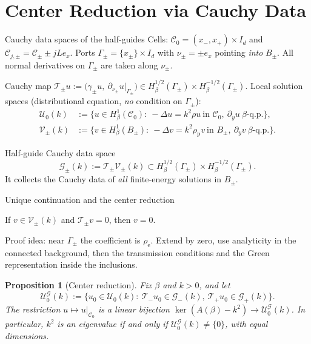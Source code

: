 \documentclass[aspectratio=169]{beamer}
\newtheorem{proposition}[theorem]{Proposition}
\begin{document}
\section{Center Reduction via Cauchy Data}

\begin{frame}{Cauchy data spaces of the half-guides}
  \small
  Cells: $\mathcal C_0=(x_-,x_+)\times I_d$ and $\mathcal C_{j,\pm}=\mathcal C_\pm\pm jLe_x$.
  Ports $\Gamma_\pm=\{x_\pm\}\times I_d$ with $\nu_\pm=\pm e_x$ pointing \emph{into}
  $B_\pm$. All normal derivatives on $\Gamma_\pm$ are taken along $\nu_\pm$.

  \medskip
  Cauchy map
  $\mathscr T_\pm u:=\bigl(\gamma_\pm u,\ \partial_{\nu_\pm}u|_{\Gamma_\pm}\bigr)\in
  H^{1/2}_\beta(\Gamma_\pm)\times H^{-1/2}_\beta(\Gamma_\pm)$. Local solution spaces
  (distributional equation, \emph{no} condition on $\Gamma_\pm$):
  \begin{align*}
    \mathcal U_0(k)&:=\{u\in H^1_\beta(\mathcal C_0):\ -\Delta u=k^2\rho u\ \text{in }\mathcal C_0,\
      \partial_yu\ \beta\text{-q.p.}\},\\
    \mathcal V_\pm(k)&:=\{v\in H^1_\beta(B_\pm):\ -\Delta v=k^2\rho_{\mathrm p}v\ \text{in }B_\pm,\
      \partial_yv\ \beta\text{-q.p.}\}.
  \end{align*}

  \begin{block}{Half-guide Cauchy data space}
    \[
      \mathcal G_\pm(k):=\mathscr T_\pm\mathcal V_\pm(k)
      \subset H^{1/2}_\beta(\Gamma_\pm)\times H^{-1/2}_\beta(\Gamma_\pm).
    \]
    It collects the Cauchy data of \emph{all} finite-energy solutions in $B_\pm$.
  \end{block}
\end{frame}

\begin{frame}{Unique continuation and the center reduction}
  \small
  \begin{lemma}
    If $v\in\mathcal V_\pm(k)$ and $\mathscr T_\pm v=0$, then $v=0$.
  \end{lemma}
  {\footnotesize Proof idea: near $\Gamma_\pm$ the coefficient is $\rho_{\mathrm e}$.
  Extend by zero, use analyticity in the connected background, then the transmission
  conditions and the Green representation inside the inclusions.}

  \begin{proposition}[Center reduction]
    Fix $\beta$ and $k>0$, and let
    \[
      \mathcal U_0^{\mathcal G}(k):=\bigl\{u_0\in\mathcal U_0(k):\
        \mathscr T_-u_0\in\mathcal G_-(k),\ \mathscr T_+u_0\in\mathcal G_+(k)\bigr\}.
    \]
    The restriction $u\mapsto u|_{\mathcal C_0}$ is a linear bijection
    $\ker(A(\beta)-k^2)\to\mathcal U_0^{\mathcal G}(k)$. In particular, $k^2$ is an
    eigenvalue if and only if $\mathcal U_0^{\mathcal G}(k)\ne\{0\}$, with equal
    dimensions.
  \end{proposition}
\end{frame}
\end{document}
